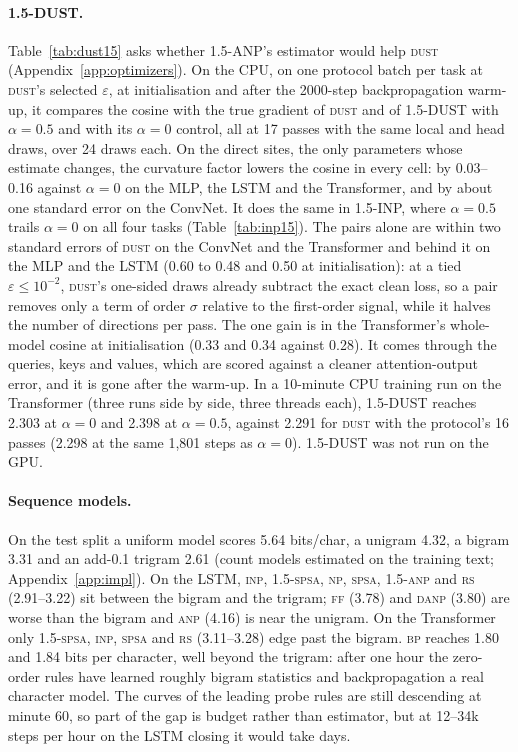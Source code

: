 \documentclass{article}
\newcommand{\method}[1]{\textsc{#1}}
\newcommand{\BP}{\method{bp}}
\newcommand{\SPSA}{\method{spsa}}
\newcommand{\SPSAb}{\method{1.5-spsa}}
\newcommand{\RS}{\method{rs}}
\newcommand{\NP}{\method{np}}
\newcommand{\ANP}{\method{anp}}
\newcommand{\ANPb}{\method{1.5-anp}}
\newcommand{\INP}{\method{inp}}
\newcommand{\DANP}{\method{danp}}
\newcommand{\FF}{\method{ff}}
\newcommand{\DUST}{\method{dust}}
\begin{document}
\paragraph{1.5-DUST.}
Table~\ref{tab:dust15} asks whether 1.5-ANP's estimator would help \DUST{}
(Appendix~\ref{app:optimizers}). On the CPU, on one protocol batch per task at \DUST{}'s
selected $\varepsilon$, at initialisation and after the 2000-step backpropagation
warm-up, it compares the cosine with the true gradient of \DUST{} and of 1.5-DUST with
$\alpha=0.5$ and with its $\alpha=0$ control, all at 17 passes with the same local and
head draws, over 24 draws each. On the direct sites, the only parameters whose estimate
changes, the curvature factor lowers the cosine in every cell: by 0.03--0.16 against
$\alpha=0$ on the MLP, the LSTM and the Transformer, and by about one standard error on the
ConvNet. It does the same in 1.5-INP, where $\alpha=0.5$ trails $\alpha=0$ on all four
tasks (Table~\ref{tab:inp15}). The pairs alone are within two standard errors of \DUST{}
on the ConvNet and the Transformer and behind it on the MLP and the LSTM (0.60 to 0.48 and
0.50 at initialisation): at a tied $\varepsilon\le10^{-2}$, \DUST{}'s one-sided draws
already subtract the exact clean loss, so a pair removes only a term of order $\sigma$
relative to the first-order signal, while it halves the number of directions per pass.
The one gain is in the Transformer's whole-model cosine at initialisation (0.33 and 0.34
against 0.28). It comes through the queries, keys and values, which are scored against a
cleaner attention-output error, and it is gone after the warm-up. In a 10-minute CPU
training run on the Transformer (three runs side by side, three threads each), 1.5-DUST
reaches 2.303 at $\alpha=0$ and 2.398 at $\alpha=0.5$, against 2.291 for \DUST{} with the
protocol's 16 passes (2.298 at the same 1,801 steps as $\alpha=0$). 1.5-DUST was not run
on the GPU.

\paragraph{Sequence models.}
On the test split a uniform model scores 5.64 bits/char, a unigram 4.32, a bigram 3.31
and an add-0.1 trigram 2.61 (count models estimated on the training text;
Appendix~\ref{app:impl}). On the LSTM, \INP{}, \SPSAb{}, \NP{}, \SPSA{}, \ANPb{} and \RS{}
(2.91--3.22) sit between the bigram and the trigram; \FF{} (3.78) and \DANP{} (3.80)
are worse than the bigram and \ANP{} (4.16) is near the unigram. On the Transformer
only \SPSAb{}, \INP{}, \SPSA{} and \RS{} (3.11--3.28) edge past the bigram. \BP{}
reaches 1.80 and 1.84 bits per character, well
beyond the trigram: after one hour the zero-order rules have learned roughly bigram
statistics and backpropagation a real character model. The curves of the leading
probe rules are still descending at minute 60, so part of the gap is budget rather
than estimator, but at 12--34k steps per hour on the LSTM closing it would take days.
\end{document}
